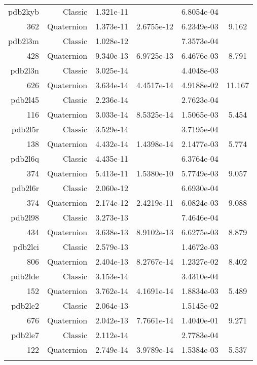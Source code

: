 \begin{xltabular}{\textwidth}{r|rS[table-format=1.3e+2]S[table-format=1.4e+2]S[table-format=1.4e+2]S[table-format=-1.3]}
pdb2kyb & Classic & 1.321e-11 &  & 6.8054e-04 & \\
362 & Quaternion & 1.373e-11 & 2.6755e-12 & 6.2349e-03 & 9.162\\  \addlinespace
pdb2l3m & Classic & 1.028e-12 &  & 7.3573e-04 & \\
428 & Quaternion & 9.340e-13 & 6.9725e-13 & 6.4676e-03 & 8.791\\  \addlinespace
pdb2l3n & Classic & 3.025e-14 &  & 4.4048e-03 & \\
626 & Quaternion & 3.634e-14 & 4.4517e-14 & 4.9188e-02 & 11.167\\  \addlinespace
pdb2l45 & Classic & 2.236e-14 &  & 2.7623e-04 & \\
116 & Quaternion & 3.033e-14 & 8.5325e-14 & 1.5065e-03 & 5.454\\  \addlinespace
pdb2l5r & Classic & 3.529e-14 &  & 3.7195e-04 & \\
138 & Quaternion & 4.432e-14 & 1.4398e-14 & 2.1477e-03 & 5.774\\  \addlinespace
pdb2l6q & Classic & 4.435e-11 &  & 6.3764e-04 & \\
374 & Quaternion & 5.413e-11 & 1.5380e-10 & 5.7749e-03 & 9.057\\  \addlinespace
pdb2l6r & Classic & 2.060e-12 &  & 6.6930e-04 & \\
374 & Quaternion & 2.174e-12 & 2.4219e-11 & 6.0824e-03 & 9.088\\  \addlinespace
pdb2l98 & Classic & 3.273e-13 &  & 7.4646e-04 & \\
434 & Quaternion & 3.638e-13 & 8.9102e-13 & 6.6275e-03 & 8.879\\  \addlinespace
pdb2lci & Classic & 2.579e-13 &  & 1.4672e-03 & \\
806 & Quaternion & 2.404e-13 & 8.2767e-14 & 1.2327e-02 & 8.402\\  \addlinespace
pdb2lde & Classic & 3.153e-14 &  & 3.4310e-04 & \\
152 & Quaternion & 3.762e-14 & 4.1691e-14 & 1.8834e-03 & 5.489\\  \addlinespace
pdb2le2 & Classic & 2.064e-13 &  & 1.5145e-02 & \\
676 & Quaternion & 2.042e-13 & 7.7661e-14 & 1.4040e-01 & 9.271\\  \addlinespace
pdb2le7 & Classic & 2.112e-14 &  & 2.7783e-04 & \\
122 & Quaternion & 2.749e-14 & 3.9789e-14 & 1.5384e-03 & 5.537\\  \addlinespace

\end{xltabular}
